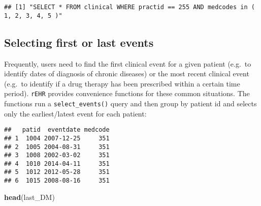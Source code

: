 \documentclass[]{article}
\newenvironment{Shaded}{\begin{snugshade}}{\end{snugshade}}
\newcommand{\KeywordTok}[1]{\textcolor[rgb]{0.13,0.29,0.53}{\textbf{{#1}}}}
\newcommand{\DataTypeTok}[1]{\textcolor[rgb]{0.13,0.29,0.53}{{#1}}}
\newcommand{\StringTok}[1]{\textcolor[rgb]{0.31,0.60,0.02}{{#1}}}
\newcommand{\NormalTok}[1]{{#1}}
\begin{document}
\begin{verbatim}
## [1] "SELECT * FROM clinical WHERE practid == 255 AND medcodes in ( 1, 2, 3, 4, 5 )"
\end{verbatim}

\subsection{Selecting first or last
events}\label{selecting-first-or-last-events}

Frequently, users need to find the first clinical event for a given
patient (e.g.~to identify dates of diagnosis of chronic diseases) or the
most recent clinical event (e.g.~to identify if a drug therapy has been
prescribed within a certain time period). \texttt{rEHR} provides
convenience functions for these common situations. The functions run a
\texttt{select\_events()} query and then group by patient id and selects
only the earliest/latest event for each patient:

\begin{Shaded}
\end{Shaded}

\begin{verbatim}
##   patid  eventdate medcode
## 1  1004 2007-12-25     351
## 2  1005 2004-08-31     351
## 3  1008 2002-03-02     351
## 4  1010 2014-04-11     351
## 5  1012 2012-05-28     351
## 6  1015 2008-08-16     351
\end{verbatim}

\begin{Shaded}
\begin{Highlighting}[]
\KeywordTok{head}\NormalTok{(last_DM)}
\end{Highlighting}
\end{Shaded}
\end{document}

